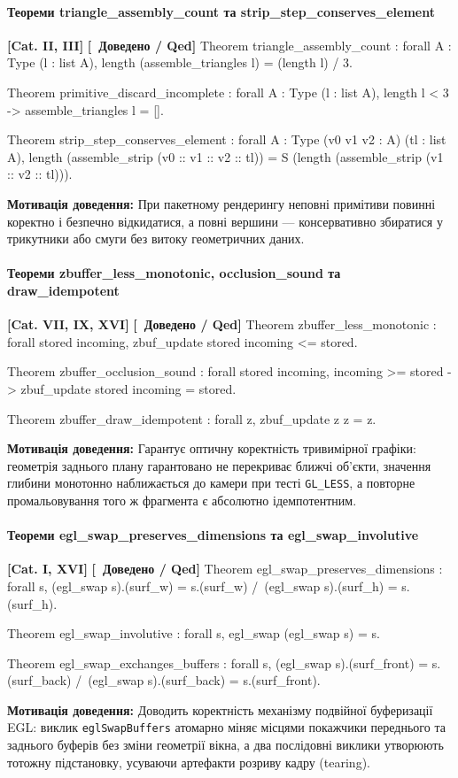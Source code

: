 \documentclass{article}
\let\originalfootnotesize\footnotesize
\let\oldverbatim\verbatim
\let\oldendverbatim\endverbatim
\renewenvironment{verbatim}{\originalfootnotesize\oldverbatim}{\oldendverbatim}
\newcommand{\thmcategory}[1]{{\small\textbf{\color{coreblue}[#1]}}}
\newcommand{\thmproven}{{\small\textbf{\color{productgreen}[\checkmark\ Доведено / Qed]}}}
\newcommand{\thmmotivation}[1]{%
  \par\smallskip\noindent\colorbox{boxbg}{\parbox{\dimexpr\linewidth-2\fboxsep\relax}{%
    \small\textbf{Мотивація доведення:} #1%
  }}\par\medskip
}
\begin{document}
\paragraph{Теореми triangle\_assembly\_count та strip\_step\_conserves\_element} \thmcategory{Cat. II, III} \thmproven
\begin{verbatim}
Theorem triangle_assembly_count : forall {A : Type} (l : list A),
  length (assemble_triangles l) = (length l) / 3.

Theorem primitive_discard_incomplete : forall {A : Type} (l : list A),
  length l < 3 ->
  assemble_triangles l = [].

Theorem strip_step_conserves_element : forall {A : Type} (v0 v1 v2 : A) (tl : list A),
  length (assemble_strip (v0 :: v1 :: v2 :: tl)) = S (length (assemble_strip (v1 :: v2 :: tl))).
\end{verbatim}
\thmmotivation{При пакетному рендерингу неповні примітиви повинні коректно і безпечно відкидатися, а повні вершини — консервативно збиратися у трикутники або смуги без витоку геометричних даних.}

\paragraph{Теореми zbuffer\_less\_monotonic, occlusion\_sound та draw\_idempotent} \thmcategory{Cat. VII, IX, XVI} \thmproven
\begin{verbatim}
Theorem zbuffer_less_monotonic : forall stored incoming,
  zbuf_update stored incoming <= stored.

Theorem zbuffer_occlusion_sound : forall stored incoming,
  incoming >= stored ->
  zbuf_update stored incoming = stored.

Theorem zbuffer_draw_idempotent : forall z,
  zbuf_update z z = z.
\end{verbatim}
\thmmotivation{Гарантує оптичну коректність тривимірної графіки: геометрія заднього плану гарантовано не перекриває ближчі об'єкти, значення глибини монотонно наближається до камери при тесті \texttt{GL\_LESS}, а повторне промальовування того ж фрагмента є абсолютно ідемпотентним.}

\paragraph{Теореми egl\_swap\_preserves\_dimensions та egl\_swap\_involutive} \thmcategory{Cat. I, XVI} \thmproven
\begin{verbatim}
Theorem egl_swap_preserves_dimensions : forall s,
  (egl_swap s).(surf_w) = s.(surf_w) /\ (egl_swap s).(surf_h) = s.(surf_h).

Theorem egl_swap_involutive : forall s,
  egl_swap (egl_swap s) = s.

Theorem egl_swap_exchanges_buffers : forall s,
  (egl_swap s).(surf_front) = s.(surf_back) /\
  (egl_swap s).(surf_back) = s.(surf_front).
\end{verbatim}
\thmmotivation{Доводить коректність механізму подвійної буферизації EGL: виклик \texttt{eglSwapBuffers} атомарно міняє місцями покажчики переднього та заднього буферів без зміни геометрії вікна, а два послідовні виклики утворюють тотожну підстановку, усуваючи артефакти розриву кадру (tearing).}
\end{document}
